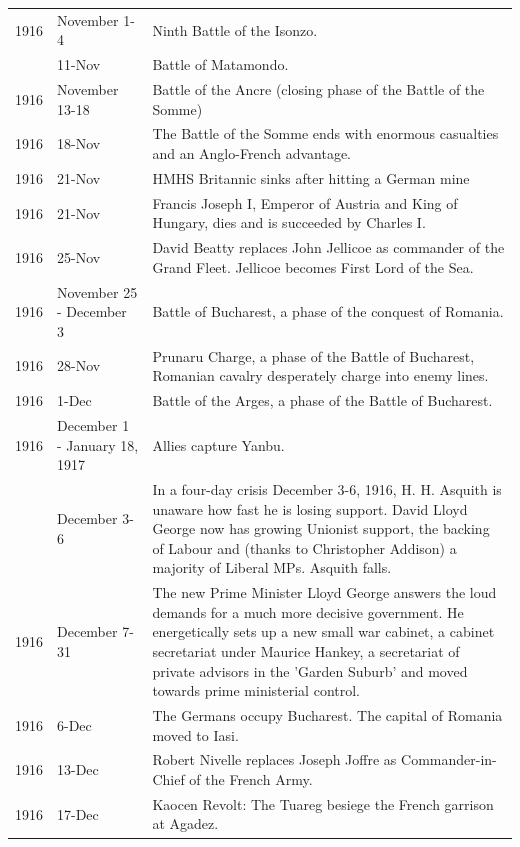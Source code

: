 \documentclass[
  openany]{book}
\begin{document}
\begin{longtable}[t]{rl>{\raggedright\arraybackslash}p{22em}}
\rowcolor{gray!6}  1916 & November 1-4 & Ninth Battle of the Isonzo.\\
\addlinespace
1916 & 11-Nov & Battle of Matamondo.\\
\rowcolor{gray!6}  1916 & November 13-18 & Battle of the Ancre (closing phase of the Battle of the Somme)\\
1916 & 18-Nov & The Battle of the Somme ends with enormous casualties and an Anglo-French advantage.\\
\rowcolor{gray!6}  1916 & 21-Nov & HMHS Britannic sinks after hitting a German mine\\
1916 & 21-Nov & Francis Joseph I, Emperor of Austria and King of Hungary, dies and is succeeded by Charles I.\\
\addlinespace
\rowcolor{gray!6}  1916 & 25-Nov & David Beatty replaces John Jellicoe as commander of the Grand Fleet. Jellicoe becomes First Lord of the Sea.\\
1916 & November 25 - December 3 & Battle of Bucharest, a phase of the conquest of Romania.\\
\rowcolor{gray!6}  1916 & 28-Nov & Prunaru Charge, a phase of the Battle of Bucharest, Romanian cavalry desperately charge into enemy lines.\\
1916 & 1-Dec & Battle of the Arges, a phase of the Battle of Bucharest.\\
\rowcolor{gray!6}  1916 & December 1 - January 18, 1917 & Allies capture Yanbu.\\
\addlinespace
1916 & December 3-6 & In a four-day crisis December 3-6, 1916, H. H. Asquith is unaware how fast he is losing support. David Lloyd George now has growing Unionist support, the backing of Labour and (thanks to Christopher Addison)  a majority of Liberal MPs. Asquith falls.\\
\rowcolor{gray!6}  1916 & December 7-31 & The new Prime Minister Lloyd George answers the loud demands for a much more decisive government. He energetically sets up a new small war cabinet, a cabinet secretariat under Maurice Hankey, a secretariat of private advisors in the 'Garden Suburb' and moved towards prime ministerial control.\\
1916 & 6-Dec & The Germans occupy Bucharest. The capital of Romania moved to Iasi.\\
\rowcolor{gray!6}  1916 & 13-Dec & Robert Nivelle replaces Joseph Joffre as Commander-in-Chief of the French Army.\\
1916 & 17-Dec & Kaocen Revolt: The Tuareg besiege the French garrison at Agadez.\\

\end{longtable}
\end{document}
